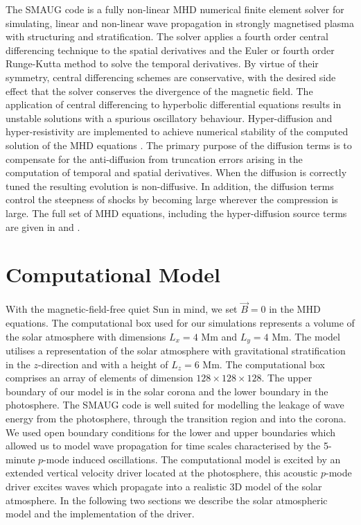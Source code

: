 \documentclass[preprint,authoryear,12pt]{elsarticle}
\begin{document}
The SMAUG code is a fully non-linear MHD numerical finite element solver for simulating, linear and non-linear wave propagation in strongly magnetised plasma with structuring and stratification. The solver applies a fourth order central differencing technique to the spatial derivatives and the Euler or fourth order Runge-Kutta method to solve the temporal derivatives. By virtue of their symmetry, central differencing schemes are conservative, with the desired side effect that the solver conserves the divergence of the magnetic field. The application of central differencing to hyperbolic differential equations results in unstable solutions with a spurious oscillatory behaviour.  Hyper-diffusion and hyper-resistivity are implemented to achieve numerical stability of the computed solution of the MHD equations \citep[see for example][]{Caunt2001}.  The primary purpose of the diffusion terms is to compensate for the anti-diffusion from truncation errors arising in the computation of temporal and spatial derivatives. When the diffusion is correctly tuned the resulting evolution is non-diffusive. In addition, the diffusion terms control the steepness of shocks by becoming large wherever the compression is large. The full set of MHD equations, including the hyper-diffusion source terms are given in \citet{Griffiths2015} and \citet{Shelyag2008}.

\section{Computational Model}

With the magnetic-field-free quiet Sun in mind, we set $\vec{B}=0$ in the MHD equations.  The computational box used for our simulations represents a volume of the solar atmosphere  with dimensions $L_{ x}= 4$ Mm and $L_{y} =4$ Mm. The model utilises a representation of the solar atmosphere with gravitational stratification in the $z$-direction and with a height of $L_{z} =6$ Mm. The computational box comprises an array of elements of dimension $128 \times 128 \times 128$. The upper boundary of our model  is in the solar corona and the lower boundary in the photosphere. The SMAUG code is well suited for modelling the leakage of wave energy from the photosphere, through the transition region and into the corona. We used open boundary conditions for the lower and upper boundaries which allowed us to model wave propagation for time scales characterised by the 5-minute $p$-mode induced oscillations. The computational model is excited by an extended vertical velocity driver located at the photosphere, this acoustic $p$-mode driver excites waves which propagate into a realistic 3D model of the solar atmosphere. In the following two sections we describe the solar atmospheric model and the implementation of the driver. 
\end{document}

